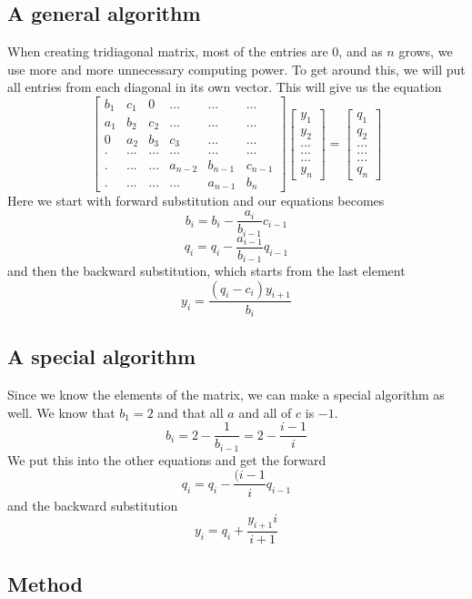 \documentclass{article}
\begin{document}
\subsection{A general algorithm}
When creating tridiagonal matrix, most of the entries are $0$, and as $n$ grows, we use more and more unnecessary computing power. To get around this, we will put all entries from each diagonal in its own vector. This will give us the equation
\[
\begin{bmatrix}
b_1 & c_1 & 0 & ... & ... & ... \\
a_1 & b_2 & c_2 & ... & ... & ... \\
0 & a_2 & b_3 & c_3 & ... & ... \\
. & ... & ... & ... & ... & ... \\
. & ... & ... & a_{n-2} & b_{n-1} & c_{n-1} \\
. & ... & ... & ... & a_{n-1} & b_{n}
\end{bmatrix}
\begin{bmatrix}
y_1 \\
y_2 \\
... \\
... \\
... \\
y_{n}
\end{bmatrix}
=
\begin{bmatrix}
q_1 \\
q_2 \\
... \\
... \\
... \\
q_{n}
\end{bmatrix}
\]
Here we start with forward substitution and our equations becomes
$$b_i = b_i - \frac{a_i}{b_{i-1}}c_{i-1}$$
$$q_i = q_i - \frac{a_{i-1}}{b_{i-1}}q_{i-1}$$
and then the backward substitution, which starts from the last element
$$y_i = \frac{(q_i - c_i)y_{i+1}}{b_i}$$

\subsection{A special algorithm}
Since we know the elements of the matrix, we can make a special algorithm as well. We know that $b_1 = 2$ and that all $a$ and all of $c$ is $-1$.
$$b_i = 2 - \frac{1}{b_{i-1}} = 2 - \frac{i - 1}{i}$$
We put this into the other equations and get the forward
$$q_i = q_i - \frac{(i - 1}{i}q_{i-1}$$
and the backward substitution
$$y_i = q_i + \frac{y_{i+1}i}{i + 1}$$

\subsection{Method}
\end{document}
